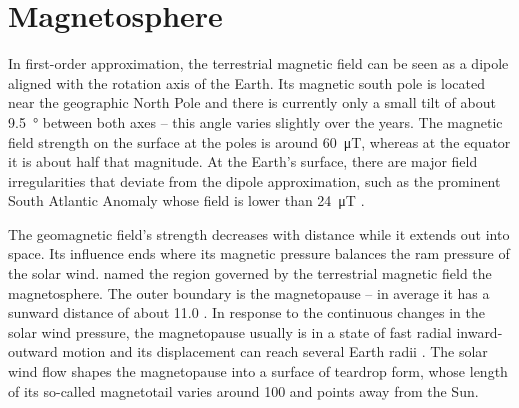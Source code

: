 \section{Magnetosphere}
\label{sec:magnetosphere}
In first-order approximation, the terrestrial magnetic field can be seen as a dipole aligned with the rotation axis of the Earth. Its magnetic south pole is located near the geographic North Pole and there is currently only a small tilt of about \SI{9.5}{\degree} between both axes \citep{Thebault2015} -- this angle varies slightly over the years. The magnetic field strength on the surface at the poles is around \SI{60}{\micro\tesla}, whereas at the equator it is about half that magnitude. At the Earth's surface, there are major field irregularities that deviate from the dipole approximation, such as the prominent South Atlantic Anomaly whose field is lower than \SI{24}{\micro\tesla} \citep{Thebault2015}.

The geomagnetic field's strength decreases with distance while it extends out into space. Its influence ends where its magnetic pressure balances the ram pressure of the solar wind. \citet{Gold1959} named the region governed by the terrestrial magnetic field the magnetosphere. The outer boundary is the magnetopause -- in average it has a sunward distance of about \SI{11.0}{\RE} \citep{Fairfield1971}. In response to the continuous changes in the solar wind pressure, the magnetopause usually is in a state of fast radial inward-outward motion and its displacement can reach several Earth radii \citep{DeKeyser2005}. The solar wind flow shapes the magnetopause into a surface of teardrop form, whose length of its so-called magnetotail varies around \SI{100}{\RE} and points away from the Sun.

